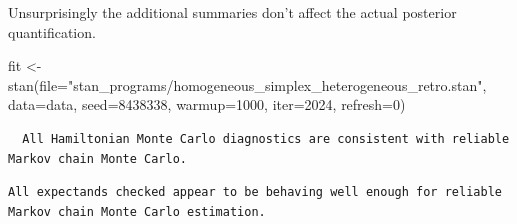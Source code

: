 \documentclass[
  letterpaper,
  DIV=11,
  numbers=noendperiod]{scrartcl}
\newenvironment{Shaded}{\begin{snugshade}}{\end{snugshade}}
\newcommand{\AttributeTok}[1]{\textcolor[rgb]{0.40,0.45,0.13}{#1}}
\newcommand{\ConstantTok}[1]{\textcolor[rgb]{0.56,0.35,0.01}{#1}}
\newcommand{\DecValTok}[1]{\textcolor[rgb]{0.68,0.00,0.00}{#1}}
\newcommand{\FunctionTok}[1]{\textcolor[rgb]{0.28,0.35,0.67}{#1}}
\newcommand{\NormalTok}[1]{\textcolor[rgb]{0.00,0.23,0.31}{#1}}
\newcommand{\OtherTok}[1]{\textcolor[rgb]{0.00,0.23,0.31}{#1}}
\newcommand{\SpecialCharTok}[1]{\textcolor[rgb]{0.37,0.37,0.37}{#1}}
\newcommand{\StringTok}[1]{\textcolor[rgb]{0.13,0.47,0.30}{#1}}
\begin{document}
Unsurprisingly the additional summaries don't affect the actual
posterior quantification.

\begin{Shaded}
\begin{Highlighting}[]
\NormalTok{fit }\OtherTok{\textless{}{-}} \FunctionTok{stan}\NormalTok{(}\AttributeTok{file=}\StringTok{"stan\_programs/homogeneous\_simplex\_heterogeneous\_retro.stan"}\NormalTok{,}
            \AttributeTok{data=}\NormalTok{data, }\AttributeTok{seed=}\DecValTok{8438338}\NormalTok{,}
            \AttributeTok{warmup=}\DecValTok{1000}\NormalTok{, }\AttributeTok{iter=}\DecValTok{2024}\NormalTok{, }\AttributeTok{refresh=}\DecValTok{0}\NormalTok{)}
\end{Highlighting}
\end{Shaded}

\begin{Shaded}
\end{Shaded}

\begin{verbatim}
  All Hamiltonian Monte Carlo diagnostics are consistent with reliable
Markov chain Monte Carlo.
\end{verbatim}

\begin{Shaded}
\end{Shaded}

\begin{verbatim}
All expectands checked appear to be behaving well enough for reliable
Markov chain Monte Carlo estimation.
\end{verbatim}
\end{document}
